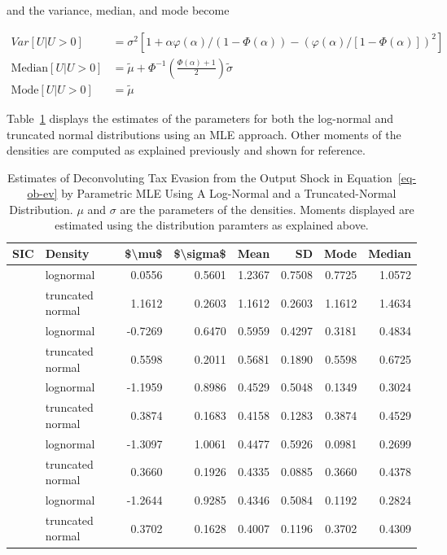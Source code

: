 \documentclass[
  12pt]{article}
\theoremstyle{definition}
\theoremstyle{remark}
\begin{document}
and the variance, median, and mode become

\[
\begin{aligned}  
Var[U|U>0]&=\sigma^2[1+\alpha\varphi(\alpha)/(1-\Phi(\alpha))-(\varphi(\alpha)/[1-\Phi(\alpha)])^2]\\
\text{Median}[U|U>0]&=\tilde\mu+\Phi^{-1}\left(\frac{\Phi(\alpha)+1}{2}\right)\tilde\sigma \\ 
\text{Mode}[U|U>0]&=\tilde\mu
\end{aligned}
\]

Table~\ref{tbl-deconv-mle-both} displays the estimates of the parameters
for both the log-normal and truncated normal distributions using an MLE
approach. Other moments of the densities are computed as explained
previously and shown for reference.

\begin{longtable}[t]{llrrrrrr}

\caption{\label{tbl-deconv-mle-both}Estimates of Deconvoluting Tax
Evasion from the Output Shock in Equation~\ref{eq-ob-ev} by Parametric
MLE Using A Log-Normal and a Truncated-Normal Distribution. \(\mu\) and
\(\sigma\) are the parameters of the densities. Moments displayed are
estimated using the distribution paramters as explained above.}

\tabularnewline

\toprule
SIC & Density & \$\textbackslash{}mu\$ & \$\textbackslash{}sigma\$ & Mean & SD & Mode & Median\\
\midrule
 & lognormal & 0.0556 & 0.5601 & 1.2367 & 0.7508 & 0.7725 & 1.0572\\
\cmidrule{2-8}\nopagebreak
\multirow[t]{-2}{*}{\raggedright\arraybackslash 322} & truncated normal & 1.1612 & 0.2603 & 1.1612 & 0.2603 & 1.1612 & 1.4634\\
\cmidrule{1-8}\pagebreak[0]
 & lognormal & -0.7269 & 0.6470 & 0.5959 & 0.4297 & 0.3181 & 0.4834\\
\cmidrule{2-8}\nopagebreak
\multirow[t]{-2}{*}{\raggedright\arraybackslash 351} & truncated normal & 0.5598 & 0.2011 & 0.5681 & 0.1890 & 0.5598 & 0.6725\\
\cmidrule{1-8}\pagebreak[0]
 & lognormal & -1.1959 & 0.8986 & 0.4529 & 0.5048 & 0.1349 & 0.3024\\
\cmidrule{2-8}\nopagebreak
\multirow[t]{-2}{*}{\raggedright\arraybackslash 331} & truncated normal & 0.3874 & 0.1683 & 0.4158 & 0.1283 & 0.3874 & 0.4529\\
\cmidrule{1-8}\pagebreak[0]
 & lognormal & -1.3097 & 1.0061 & 0.4477 & 0.5926 & 0.0981 & 0.2699\\
\cmidrule{2-8}\nopagebreak
\multirow[t]{-2}{*}{\raggedright\arraybackslash 313} & truncated normal & 0.3660 & 0.1926 & 0.4335 & 0.0885 & 0.3660 & 0.4378\\
\cmidrule{1-8}\pagebreak[0]
 & lognormal & -1.2644 & 0.9285 & 0.4346 & 0.5084 & 0.1192 & 0.2824\\
\cmidrule{2-8}\nopagebreak
\multirow[t]{-2}{*}{\raggedright\arraybackslash 342} & truncated normal & 0.3702 & 0.1628 & 0.4007 & 0.1196 & 0.3702 & 0.4309\\
\bottomrule

\end{longtable}
\end{document}
